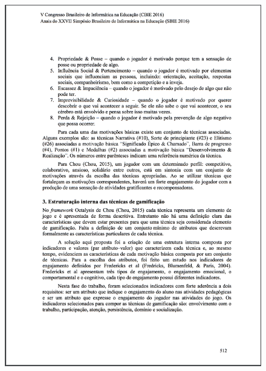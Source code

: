 \begin{apendicesenv}
\begin{figure}[h]
	\centering
		\includegraphics[keepaspectratio=true,scale=0.6]{figuras/a3.png}
\end{figure}


\end{apendicesenv}
